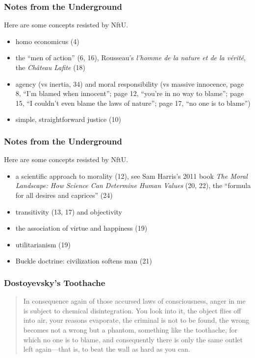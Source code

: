 \documentclass[xcolor=dvipsnames]{beamer}
\begin{document}
\begin{frame}
  \frametitle{Notes from the Underground}
  Here are some concepts resisted by NftU.
  \begin{itemize}
  \item homo economicus (4)
  \item the ``men of action'' (6, 16), Rousseau's \emph{l'homme de la
      nature et de la v{\'e}rit{\'e}}, the \emph{Ch{\^a}teau Lafite}
    (18)
  \item agency (vs inertia, 34) and moral responsibility (vs massive
    innocence, page 8, ``I'm blamed when innocent''; page 12, ``you're
    in no way to blame''; page 15, ``I couldn't even blame the laws of
    nature''; page 17, ``no one is to blame'')
  \item simple, straightforward justice (10)
  \end{itemize}
\end{frame}

\begin{frame}
  \frametitle{Notes from the Underground}
  Here are some concepts resisted by NftU.
  \begin{itemize}
  \item a scientific approach to morality (12), see Sam Harris's 2011
    book \emph{The Moral Landscape: How Science Can Determine Human
      Values} (20, 22), the ``formula for all desires and caprices''
    (24)
  \item transitivity (13, 17) and objectivity
  \item the association of virtue and happiness (19)
  \item utilitarianism (19)
  \item Buckle doctrine: civilization softens man (21)
  \end{itemize}
\end{frame}

\begin{frame}
  \frametitle{Dostoyevsky's Toothache}
  \begin{quote}
    In consequence again of those accursed laws of consciousness,
    anger in me is subject to chemical disintegration. You look
    into it, the object flies off into air, your reasons
    evaporate, the criminal is not to be found, the wrong becomes
    not a wrong but a phantom, something like the toothache, for
    which no one is to blame, and consequently there is only the
    same outlet left again---that is, to beat the wall as hard as
    you can.
  \end{quote}
\end{frame}
\end{document}
